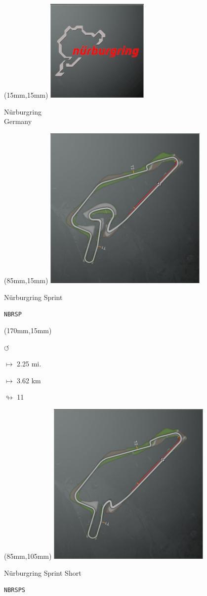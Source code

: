 \begin{textblock*}{60mm}(15mm,15mm)%
\includegraphics[width=50mm]{LG/2015-05-20_00089.png}
\par Nürburgring\\ Germany
\end{textblock*}
\begin{textblock*}{80mm}(85mm,15mm)%
\includegraphics[width=80mm]{TR/2015-05-20_00043.png}
\centerline{Nürburgring Sprint}
\par\hfill\tiny\tt NBRSP\\
\end{textblock*}
\begin{textblock*}{30mm}(170mm,15mm)%
\par \Huge$\circlearrowleft$
\Large
\par$\mapsto$ 2.25 mi.
\par$\mapsto$ 3.62 km
\par$\looparrowright$ 11
\end{textblock*}
\begin{textblock*}{80mm}(85mm,105mm)%
\includegraphics[width=80mm]{TR/2015-05-20_00044.png}
\centerline{Nürburgring Sprint Short}
\par\hfill\tiny\tt NBRSPS\\
\end{textblock*}
